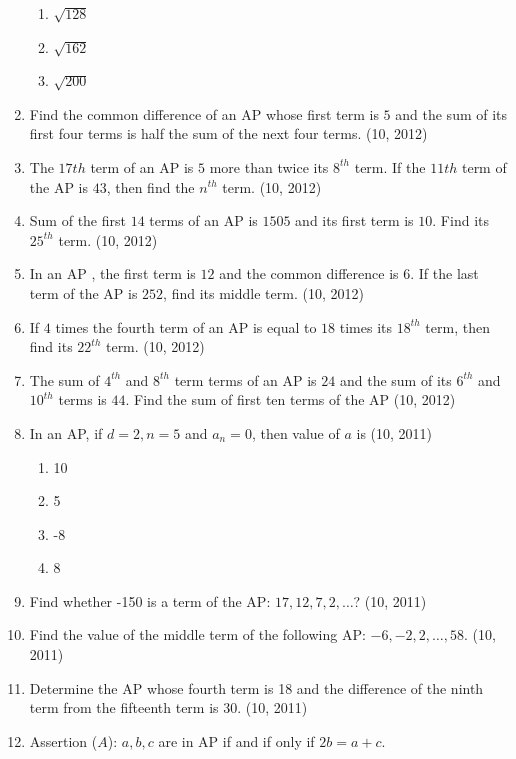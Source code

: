 \begin{enumerate}[label=\thesubsection.\arabic*,ref=\thesubsection.\theenumi,itemsep=1pt]
\begin{multicols}{4}
\begin{enumerate}
 \item $\sqrt {128}$ 
 \item $\sqrt {162}$ 
 \item $\sqrt {200}$ 
\end{enumerate}
\end{multicols}
 \item Find the common difference of an AP whose first term is $5$ and the sum of its first four terms is half the sum of the next four terms. 
 \hfill (10, 2012) \item The $17th$ term of an AP is $5$ more than twice its $8^{th}$ term. If the $11th$ term of the AP is $43$, then find the $n^{th}$ term. 
%
\hfill (10, 2012) \item Sum of the first $14$ terms of an  AP  is $1505$ and its first term is $10$. Find its $25^{th}$ term. 
\hfill (10, 2012) \item In an  AP , the first term is $12$ and the common difference is $6$. If the last term of the  AP  is $252$, find its middle term. 
\hfill (10, 2012) \item If $4$ times the fourth term of an  AP  is equal to $18$ times its $18^{th}$ term, then find its $22^{th}$ term. 
\hfill (10, 2012) \item The sum of $4^{th}$ and $8^{th}$ term terms of an  AP  is $24$ and the sum of its $6^{th}$ and $10^{th}$ terms is $44$. Find the sum of first ten terms of the  AP  
\hfill (10, 2012)
\item In an AP, if $d=2, n=5$ and $a_n=0$, then value of $a$ is
    \hfill (10, 2011)
    \begin{multicols}{4}
\begin{enumerate}
%
\item 10
%
\item 5
%
\item -8
%
\item 8
    \end{enumerate}
\end{multicols}
\item Find whether -150 is a term of the AP: $17, 12, 7, 2,\dots$?
    \hfill (10, 2011)
\item Find the value of the middle term of the following AP: $- 6, -2, 2,\dots, 58.$
   \hfill (10, 2011)
\item Determine the AP whose fourth term is 18 and the difference of the ninth term from the fifteenth term is 30.
    \hfill (10, 2011)
\item
	{Assertion ($A$):} $a,b,c$ are in  AP  if and if only if $2b = a + c$.

\end{enumerate}
